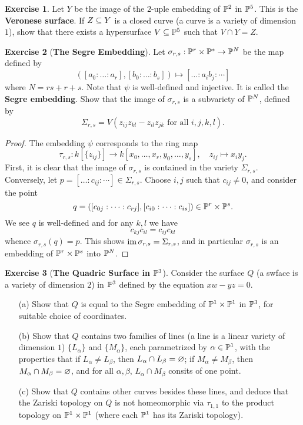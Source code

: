 \documentclass[11pt]{book}
\theoremstyle{definition}
\newtheorem{exercise}{Exercise}[section]
\begin{document}
\begin{exercise}
Let $Y$ be the image of the $2$-uple embedding of $\P^2$ in $\P^5$. This is the \textbf{Veronese surface}. If $Z\sub Y$ is a closed curve (a curve is a variety of dimension $1$), show that there exists a hypersurface $V\sub\P^5$ such that $V\cap Y=Z$.
\end{exercise}
\begin{exercise}[\textbf{The Segre Embedding}]\label{Segre embedding}
Let $\sigma_{r,s}:\P^r\times\P^s\to\P^N$ be the map defined by
\[([a_0:\dots:a_r],[b_0:\dots:b_s])\mapsto[\dots:a_ib_j:\cdots]\]
where $N=rs+r+s$. Note that $\psi$ is well-defined and injective. It is called the \textbf{Segre embedding}. Show that the image of $\sigma_{r,s}$ is a subvariety of $\P^N$, defined by
\[\Sigma_{r,s}=V(z_{ij}z_{kl}-z_{il}z_{jk}\text{ for all $i,j,k,l$}).\]
\end{exercise}
\begin{proof}
The embedding $\psi$ corresponds to the ring map
\[\tau_{r,s}:k[\{z_{ij}\}]\to k[x_0,\dots,x_r,y_0,\dots,y_s],\quad z_{ij}\mapsto x_iy_j.\]
First, it is clear that the image of $\sigma_{r,s}$ is contained in the variety $\Sigma_{r,s}$. Conversely, let $p=[\dots:c_{ij}:\cdots]\in\Sigma_{r,s}$. Choose $i,j$ such that $c_{ij}\neq 0$, and consider the point
\[q=([c_{0j}:\dots:c_{rj}],[c_{i0}:\dots:c_{is}])\in\P^r\times\P^s.\]
We see $q$ is well-defined and for any $k,l$ we have
\[c_{kj}c_{il}=c_{ij}c_{kl}\]
whence $\sigma_{r,s}(q)=p$. This shows $\im\sigma_{r,s}=\Sigma_{r,s}$, and in particular $\sigma_{r,s}$ is an embedding of $\P^r\times\P^s$ into $\P^N$.
\end{proof}
\begin{exercise}[\textbf{The Quadric Surface in $\P^3$}]
Consider the surface $Q$ (a swface is a variety of dimension $2$) in $\P^3$ defined by the equation $xw-yz=0$.
\begin{itemize}
\item[(a)] Show that $Q$ is equal to the Segre embedding of $\P^1\times\P^1$ in $\P^3$, for suitable choice of coordinates.
\item[(b)] Show that $Q$ contains two families of lines (a line is a linear variety of dimension $1$) $\{L_\alpha\}$ and $\{M_\alpha\}$, each parametrized by $\alpha\in\P^1$, with the properties that if $L_\alpha\neq L_\beta$, then $L_\alpha\cap L_\beta=\emp$; if $M_\alpha\neq M_\beta$, then $M_\alpha\cap M_\beta=\emp$, and for all $\alpha,\beta$, $L_\alpha\cap M_\beta$ consits of one point.
\item[(c)] Show that $Q$ contains other curves besides these lines, and deduce that the Zariski topology on $Q$ is not homeomorphic via $\tau_{1,1}$ to the product topology on $\P^1\times\P^1$ (where each $\P^1$ has its Zariski topology).
\end{itemize}
\end{exercise}
\end{document}
